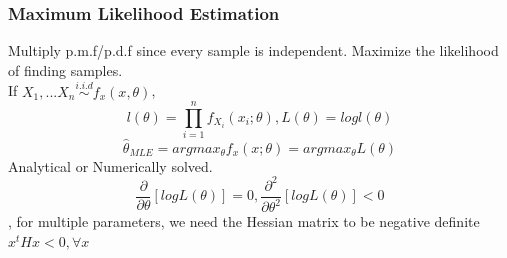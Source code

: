 \documentclass[11pt, openany]{book}              %
\begin{document}
\subsubsection{Maximum Likelihood Estimation}

Multiply p.m.f/p.d.f since every sample is independent. Maximize the likelihood of finding samples. \\ If $X_1,...X_n \stackrel{i.i.d}{\sim} f_x(x, \theta)$, 
    	$$ l(\theta) =  \prod_{i=1}^n f_{X_i} (x_i; \theta), L(\theta ) = log l(\theta)$$
    	$$ \hat{\theta}_{MLE}= argmax_{\theta} f_x(x;\theta ) = argmax_{\theta} L(\theta )$$
    	Analytical or Numerically solved. $$ \frac{\partial}{\partial \theta} [log L(\theta ) ] = 0, \frac{\partial^2}{\partial \theta^2} [log L(\theta ) ] < 0$$, for multiple parameters, we need the Hessian matrix to be negative definite $x^tHx<0, \forall x$ 
    	
\end{document}
